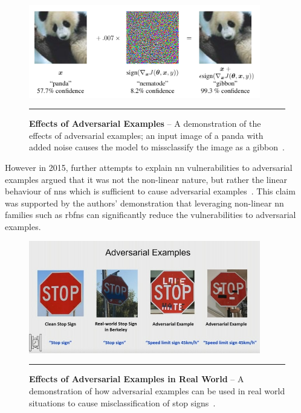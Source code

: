 \begin{figure}[H]
\center
\includegraphics[width=0.9\textwidth]{media/literature/adversarial-example.png}
    \rule{35em}{0.5pt}
    \caption[Demonstration of the effects of adversarial examples]{\textbf{Effects of Adversarial Examples} -- A demonstration of the effects of adversarial examples; an input image of a panda with added noise causes the model to missclassify the image as a gibbon~\citep{goodfellow2015}.}\label{fig:adversarial-example}
\end{figure}

However in 2015, further attempts to explain \gls{nn} vulnerabilities to adversarial examples argued
that it was not the non-linear nature, but rather the linear behaviour of \glspl{nn} which is sufficient 
to cause adversarial examples~\citep{goodfellow2015}. This claim was supported by the authors' demonstration that
leveraging non-linear \gls{nn} families such as \Glspl{rbfn} can significantly reduce the vulnerabilities to adversarial examples.

\begin{figure}[H]
\center
\includegraphics[width=0.9\textwidth]{media/literature/stop-sign.jpg}
    \rule{35em}{0.5pt}
    \caption[Demonstration of the effects of adversarial examples in real world]{\textbf{Effects of Adversarial Examples in Real World} -- A demonstration of how adversarial examples can be used in real world situations to cause misclassification of stop signs~\citep{eykholt2018}.}\label{fig:stop-sign}
\end{figure}

